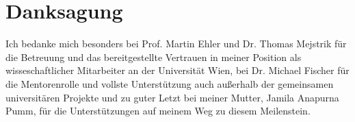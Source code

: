 
\chapter*{Danksagung}
\label{ch:danksagung}
Ich bedanke mich besonders bei Prof. Martin Ehler und Dr. Thomas Mejstrik für die Betreuung und das bereitgestellte Vertrauen in meiner Position als wisseschaftlicher Mitarbeiter an der Universität Wien, bei Dr. Michael Fischer für die Mentorenrolle und vollste Unterstützung auch außerhalb der gemeinsamen universitären Projekte und zu guter Letzt bei meiner Mutter, Jamila Anapurna Pumm, für die Unterstützungen auf meinem Weg zu diesem Meilenstein.